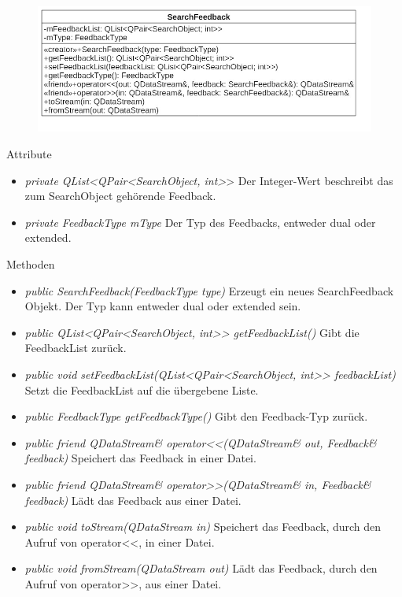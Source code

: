 \begin{figure}[H]
\centering
\includegraphics[scale=0.5]{img/Klassendiagramm/Klassen/Model/SearchFeedback}
\label{fig:searchFeedback}
\end{figure}

Attribute
\begin{itemize}
\item\textit{private QList<QPair<SearchObject, int>}> Der Integer-Wert beschreibt das zum SearchObject gehörende Feedback.
\item\textit{private FeedbackType mType} Der Typ des Feedbacks, entweder dual oder extended.
\end{itemize}

Methoden
\begin{itemize}
\item \textit{public SearchFeedback(FeedbackType type)} Erzeugt ein neues SearchFeedback Objekt. Der Typ kann entweder dual oder extended sein.
\item \textit{public QList<QPair<SearchObject, int>}\textit{>  getFeedbackList()} Gibt die FeedbackList  zurück.
\item \textit{public void setFeedbackList(QList<QPair<SearchObject, int>}\textit{> feedbackList)} Setzt die FeedbackList auf die übergebene Liste.
\item \textit{public FeedbackType getFeedbackType()} Gibt den Feedback-Typ zurück.
\item \textit{public friend QDataStream\& operator<<(QDataStream\& out, Feedback\& feedback)} Speichert das Feedback in einer Datei.
\item \textit{public friend QDataStream\& operator>>(QDataStream\& in, Feedback\& feedback)} Lädt das Feedback aus einer Datei.
\item \textit{public void toStream(QDataStream in)} Speichert das Feedback, durch den Aufruf von operator<<, in einer Datei.
\item \textit{public void fromStream(QDataStream out)} Lädt das Feedback, durch den Aufruf von operator>>, aus einer Datei.
\end{itemize} 

